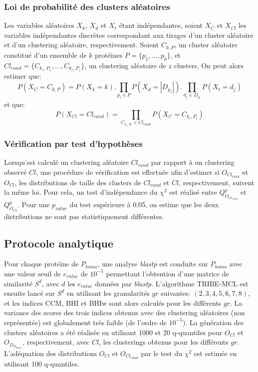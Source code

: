 \subsubsection{Loi de probabilité des clusters aléatoires}
	Les variables aléatoires $X_{k}$, $X_{d}$ et $X_{t}$ étant indépendantes, soient $X_{C}$ et $X_{Cl}$ les variables indépendantes discrètes correspondant aux tirages d'un cluster aléatoire et d'un clustering aléatoire, respectivement. Soient $C_{k,P}$, un cluster aléatoire constitué d'un ensemble de $k$ protéines $P=\{p_{1},...,p_{k}\}$, et $Cl_{rand}=\{C_{k_{1},P_{1}},...,C_{k_{z},P_{z}} \}$, un clustering aléatoire de $z$ clusters. On peut alors estimer que:
	\begin{equation}
		P(X_{C}=C_{k,P})=P(X_{k}=k).\prod_{p_{i} \in P}P(X_{d}=|D_{p_{i}}|).\prod_{d_{j} \in D_{p_{i}}}P(X_{t}=d_{j})
	\end{equation}
et que:
	\begin{equation}
		P(X_{Cl}=Cl_{rand})=\prod_{C_{k_{i},P_{i}} \in Cl_{rand}}P(X_{C}=C_{k_{i},P_{i}})
	\end{equation}

\subsubsection{Vérification par test d'hypothèses}
    Lorsqu'est calculé un clustering aléatoire $Cl_{rand}$ par rapport à un clustering observé $Cl$, une procédure de vérification est effectuée afin d'estimer si $O_{Cl_{rand}}$ et $O_{Cl}$, les distributions de taille des clusters de $Cl_{rand}$ et $Cl$, respectivement, suivent la même loi. Pour cela, un test d'indépendance du $\chi^{2}$ est réalisé entre $Q_{O_{Cl_{rand}}}^{p}$ et $Q_{O_{Cl}}^{p}$. Pour une $p_{value}$ du test supérieure à 0.05, on estime que les deux distributions ne sont pas statistiquement différentes.


\subsection{Protocole analytique}
    Pour chaque protéine de $P_{homo}$, une analyse \textit{blastp} est conduite sur $P_{homo}$ avec une valeur seuil de $e_{value}$ de $10^{-5}$ permettant l'obtention d'une matrice de similarité $S^{d}$, avec $d$ les $e_{value}$ données par \textit{blastp}. L'algorithme TRIBE-MCL est ensuite lancé sur $S^{d}$ en utilisant les granularités $gr$ suivantes: $(2,3,4,5,6,7,8)$, et les indices CCM, BHI et BHIw sont alors calculés pour les différents $gr$. La variance des scores des trois indices obtenus avec des clustering aléatoires (non représentée) est globalement très faible (de l'ordre de $10^{-5}$). La génération des clusters aléatoires a été réalisée en utilisant 1000 et 20 q-quantiles pour $O_{Cl}$ et $O_{D_{P_{homo}}}$, respectivement, avec $Cl$, les clusterings obtenus pour les différents $gr$. L'adéquation des distributions $O_{Cl}$ et $O_{Cl_{rand}}$ par le test du $\chi^{2}$ est estimée en utilisant 100 q-quantiles.
  
